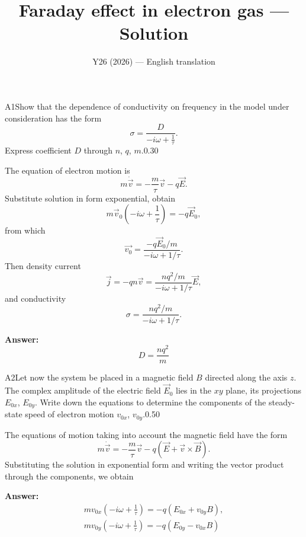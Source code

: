 \documentclass[11pt,a4paper]{article}
\title{\textbf{Faraday effect in electron gas --- Solution}}
\author{\normalsize Y26 (2026) — English translation}
\date{}
\begin{document}
\maketitle\vspace{-0.5em}
\begin{solcard}{A1}{Show that the dependence of conductivity on frequency in the model under consideration has the form $$ \sigma = \frac{D}{-i \omega + \frac{1}{\tau}}. $$Express coefficient $D$ through $n$, $q$, $m$.}{0.30}

The equation of electron motion is $$ m \dot{\vec{v}} = - \frac{m}{\tau} \vec{v}  - q \vec{E}. $$Substitute solution in form exponential, obtain $$ m\vec{v}_0\left( -i \omega + \frac{1}{\tau}\right) = - q \vec{E}_0, $$from which $$ \vec{v_0} = \frac{-q\vec{E}_0/m}{-i \omega + 1/\tau}. $$Then density current $$ \vec{j} = -q n \vec{v} = \frac{n q^2/m}{-i \omega + 1/\tau} \vec{E}, $$and conductivity $$ \sigma = \frac{n q^2/m}{-i \omega + 1/\tau}. $$

\par\smallskip\noindent\textbf{Answer:} $$ D = \frac{n q^2}{m} $$
\end{solcard}

\begin{solcard}{A2}{Let now the system be placed in a magnetic field $B$ directed along the axis $z$. The complex amplitude of the electric field $\vec{E}_0$ lies in the $xy$ plane, its projections $E_{0x}$, $E_{0y}$. Write down the equations to determine the components of the steady-state speed of electron motion $v_{0x}$, $v_{0y}$.}{0.50}

The equations of motion taking into account the magnetic field have the form $$ m \dot{\vec{v}} = - \frac{m}{\tau} \vec{v}  - q( \vec{E} + \vec{v} \times \vec{B}). $$Substituting the solution in exponential form and writing the vector product through the components, we obtain

\par\smallskip\noindent\textbf{Answer:} \begin{align*} m v_{0x}\left( -i \omega + \frac{1}{\tau}\right) = - q \left(E_{0x}+ v_{0y}B \right), \\ m v_{0y}\left( -i \omega + \frac{1}{\tau}\right) = - q \left(E_{0y} - v_{0x} B\right) \\ \end{align*}
\end{solcard}
\end{document}
